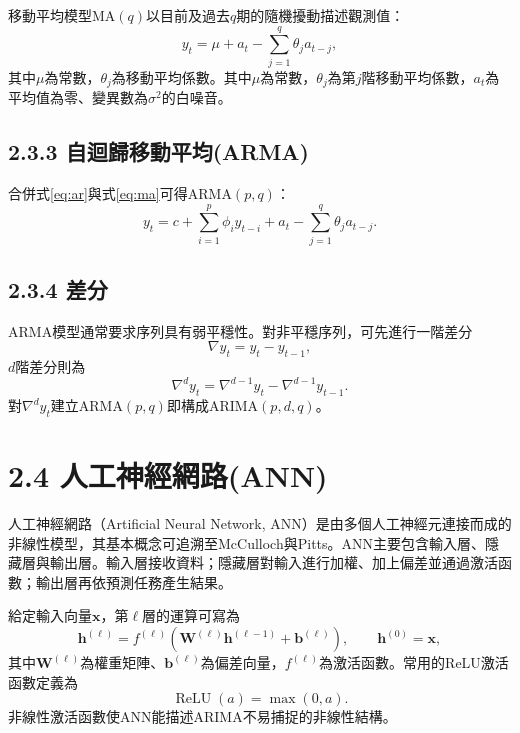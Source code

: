 移動平均模型MA$(q)$以目前及過去$q$期的隨機擾動描述觀測值：
\begin{equation}
 y_t=\mu+a_t-\sum_{j=1}^{q}\theta_ja_{t-j},
 \label{eq:ma}
\end{equation}
其中$\mu$為常數，$\theta_j$為移動平均係數。其中$\mu$為常數，$\theta_j$為第$j$階移動平均係數，$a_t$為平均值為零、變異數為$\sigma^2$的白噪音。

\subsection*{2.3.3 自迴歸移動平均(ARMA)}

合併式\eqref{eq:ar}與式\eqref{eq:ma}可得ARMA$(p,q)$：
\begin{equation}
 y_t=c+\sum_{i=1}^{p}\phi_i y_{t-i}
 +a_t-\sum_{j=1}^{q}\theta_ja_{t-j}.
 \label{eq:arma}
\end{equation}

\subsection*{2.3.4 差分}

ARMA模型通常要求序列具有弱平穩性。對非平穩序列，可先進行一階差分
\begin{equation}
 \nabla y_t=y_t-y_{t-1},
\end{equation}
$d$階差分則為
\begin{equation}
 \nabla^d y_t=\nabla^{d-1}y_t-\nabla^{d-1}y_{t-1}.
\end{equation}
對$\nabla^d y_t$建立ARMA$(p,q)$即構成ARIMA$(p,d,q)$。

\section*{2.4 人工神經網路(ANN)}

人工神經網路（Artificial Neural Network, ANN）是由多個人工神經元連接而成的非線性模型，其基本概念可追溯至McCulloch與Pitts\cite{mcculloch1943}。ANN主要包含輸入層、隱藏層與輸出層。輸入層接收資料；隱藏層對輸入進行加權、加上偏差並通過激活函數；輸出層再依預測任務產生結果。

給定輸入向量$\boldsymbol x$，第$\ell$層的運算可寫為
\begin{equation}
 \boldsymbol h^{(\ell)}
 =f^{(\ell)}\!\left(
 \boldsymbol W^{(\ell)}\boldsymbol h^{(\ell-1)}
 +\boldsymbol b^{(\ell)}\right),
 \qquad \boldsymbol h^{(0)}=\boldsymbol x,
\end{equation}
其中$\boldsymbol W^{(\ell)}$為權重矩陣、$\boldsymbol b^{(\ell)}$為偏差向量，$f^{(\ell)}$為激活函數。常用的ReLU激活函數定義為
\begin{equation}
 \operatorname{ReLU}(a)=\max(0,a).
\end{equation}
非線性激活函數使ANN能描述ARIMA不易捕捉的非線性結構。

